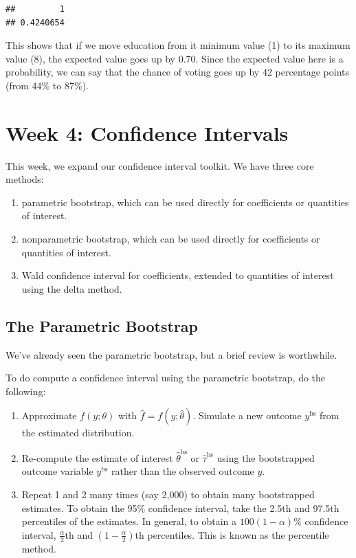 \documentclass[
]{book}
\providecommand{\tightlist}{%
  \setlength{\itemsep}{0pt}\setlength{\parskip}{0pt}}
\begin{document}
\begin{verbatim}
##         1 
## 0.4240654
\end{verbatim}

This shows that if we move education from it minimum value (1) to its maximum value (8), the expected value goes up by 0.70. Since the expected value here is a probability, we can say that the chance of voting goes up by 42 percentage points (from 44\% to 87\%).

\hypertarget{week-4-confidence-intervals}{%
\chapter{Week 4: Confidence Intervals}\label{week-4-confidence-intervals}}

This week, we expand our confidence interval toolkit. We have three core methods:

\begin{enumerate}
\def\labelenumi{\arabic{enumi}.}
\tightlist
\item
  parametric bootstrap, which can be used directly for coefficients or quantities of interest.
\item
  nonparametric bootstrap, which can be used directly for coefficients or quantities of interest.
\item
  Wald confidence interval for coefficients, extended to quantities of interest using the delta method.
\end{enumerate}

\hypertarget{the-parametric-bootstrap-1}{%
\section{The Parametric Bootstrap}\label{the-parametric-bootstrap-1}}

We've already seen the parametric bootstrap, but a brief review is worthwhile.

To do compute a confidence interval using the parametric bootstrap, do the following:

\begin{enumerate}
\def\labelenumi{\arabic{enumi}.}
\tightlist
\item
  Approximate \(f(y; \theta)\) with \(\hat{f} = f(y; \hat{\theta})\). Simulate a new outcome \(y^{\text{bs}}\) from the estimated distribution.
\item
  Re-compute the estimate of interest \(\hat{\theta}^{\text{bs}}\) or \(\hat{\tau}^{\text{bs}}\) using the bootstrapped outcome variable \(y^{\text{bs}}\) rather than the observed outcome \(y\).
\item
  Repeat 1 and 2 many times (say 2,000) to obtain many bootstrapped estimates. To obtain the 95\% confidence interval, take the 2.5th and 97.5th percentiles of the estimates. In general, to obtain a \(100(1 - \alpha)\%\) confidence interval, \(\frac{\alpha}{2}\)th and \((1 - \frac{\alpha}{2})\)th percentiles. This is known as the percentile method.
\end{enumerate}
\end{document}
